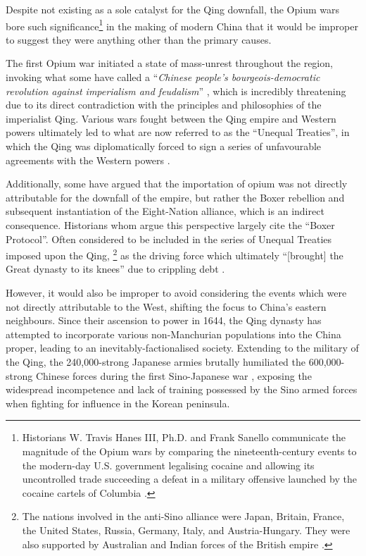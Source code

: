 \documentclass{article}
\begin{document}
Despite not existing as a sole catalyst for the Qing downfall, the Opium wars bore such significance\footnote{Historians W. Travis Hanes III, Ph.D. and Frank Sanello communicate the magnitude of the Opium wars by comparing the nineteenth-century events to the modern-day U.S. government legalising cocaine and allowing its uncontrolled trade succeeding a defeat in a military offensive launched by the cocaine cartels of Columbia
\autocite{Hanes:2004}.} in the making of modern China that it would be improper to suggest they were anything other than the primary causes.

The first Opium war initiated a state of mass-unrest throughout the region, invoking what some have called a ``\textit{Chinese people's bourgeois-democratic revolution against imperialism and feudalism}''
\autocite{Janin:1999}, which is incredibly threatening due to its direct contradiction with the principles and philosophies of the imperialist Qing. Various wars fought between the Qing empire and Western powers ultimately led to what are now referred to as the ``Unequal Treaties'', in which the Qing was diplomatically forced to sign a series of unfavourable agreements with the Western powers \autocite{Wang:2005}.

Additionally, some have argued that the importation of opium was not directly attributable for the downfall of the empire, but rather the Boxer rebellion and subsequent instantiation of the Eight-Nation alliance, which is an indirect consequence. Historians whom argue this perspective largely cite the ``Boxer Protocol''. Often considered to be included in the series of Unequal Treaties imposed upon the Qing, \footnote{The nations involved in the anti-Sino alliance were Japan, Britain, France, the United States, Russia, Germany, Italy, and Austria-Hungary. They were also supported by Australian and Indian forces of the British empire
\autocite{Gardener:2016}.} as the driving force which ultimately ``[brought] the Great dynasty to its knees'' due to crippling debt \autocite{Mitchell:2008}.

However, it would also be improper to avoid considering the events which were not directly attributable to the West, shifting the focus to China's eastern neighbours. Since their ascension to power in 1644, the Qing dynasty has attempted to incorporate various non-Manchurian populations into the China proper, leading to an inevitably-factionalised society. Extending to the military of the Qing, the 240,000-strong Japanese armies brutally humiliated the 600,000-strong Chinese forces during the first Sino-Japanese war
\autocite{Fenby:2013}, exposing the widespread incompetence and lack of training possessed by the Sino armed forces
\autocite{Jowett:2013} when fighting for influence in the Korean peninsula.
\end{document}
